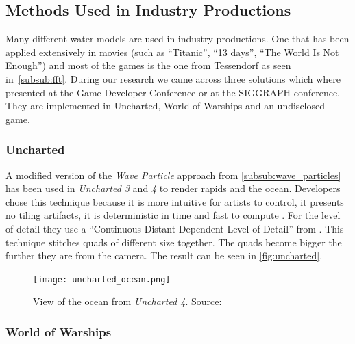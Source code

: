 \subsection{Methods Used in Industry Productions}\label{subsec:methods_industry}


Many different water models are used in industry productions. One that has been
applied extensively in movies (such as ``Titanic'', ``13 days'', ``The World Is
Not Enough'') and most of the games is the one from Tessendorf
\autocite{tessendorf2001simulating} as seen in~\ref{subsub:fft}.  During our
research we came across three solutions which where presented at the Game
Developer Conference or at the SIGGRAPH conference. They are implemented in
Uncharted, World of Warships and an undisclosed game.

\subsubsection{Uncharted}\label{subsub:uncharted}

A modified version of the \textit{Wave Particle} approach from
\autoref{subsub:wave_particles} has been used in \textit{Uncharted 3} and
\textit{4} to render rapids and the ocean. Developers chose this technique
because it is more intuitive for artists to control, it presents no tiling
artifacts, it is deterministic in time and fast to compute
\autocite{gonzalez2012water}. For the level of detail they use a ``Continuous
Distant-Dependent Level of Detail'' from \autocite{strugar2009continuous}. This
technique stitches quads of different size together. The quads become bigger the
further they are from the camera. The result can be seen in
\autoref{fig:uncharted}.

\begin{figure}[h]
    \centering
    \texttt{[image: uncharted\_ocean.png]}
    \caption{View of the ocean from \textit{Uncharted 4}. Source:
    \autocite{gonzalez2016rendering}}\label{fig:uncharted}
\end{figure}


\subsubsection{World of Warships}\label{subsub:world_of_warships}

